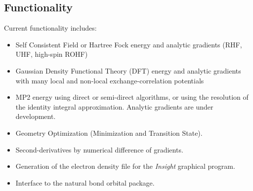 \subsection{Functionality}
\label{sec:functionality}

Current functionality includes:
\begin{itemize}
\item Self Consistent Field or Hartree Fock energy and analytic
  gradients (RHF, UHF, high-spin ROHF)
\item Gaussian Density Functional Theory (DFT) energy and analytic
  gradients with many local and
      non-local exchange-correlation potentials
\item MP2 energy using direct or semi-direct algorithms, or using the
  resolution of the identity integral approximation.  Analytic
  gradients are under development.
\item Geometry Optimization (Minimization and Transition State).
\item Second-derivatives by numerical difference of gradients.
\item Generation of the electron density file for the {\em Insight}
      graphical program.
\item Interface to the natural bond orbital package.
\end{itemize}

